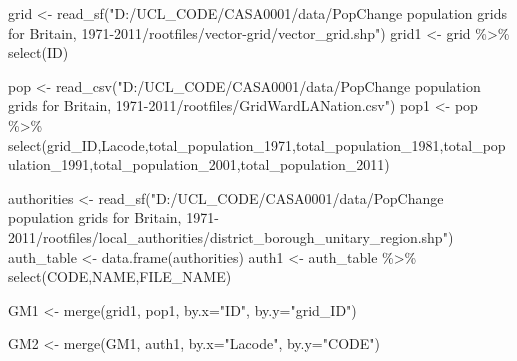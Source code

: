 \documentclass[
]{article}
\newenvironment{Shaded}{\begin{snugshade}}{\end{snugshade}}
\newcommand{\AttributeTok}[1]{\textcolor[rgb]{0.77,0.63,0.00}{#1}}
\newcommand{\FunctionTok}[1]{\textcolor[rgb]{0.00,0.00,0.00}{#1}}
\newcommand{\NormalTok}[1]{#1}
\newcommand{\OtherTok}[1]{\textcolor[rgb]{0.56,0.35,0.01}{#1}}
\newcommand{\SpecialCharTok}[1]{\textcolor[rgb]{0.00,0.00,0.00}{#1}}
\newcommand{\StringTok}[1]{\textcolor[rgb]{0.31,0.60,0.02}{#1}}
\begin{document}
\begin{Shaded}
\begin{Highlighting}[]
\NormalTok{grid }\OtherTok{\textless{}{-}} \FunctionTok{read\_sf}\NormalTok{(}\StringTok{"D:/UCL\_CODE/CASA0001/data/PopChange population grids for Britain, 1971{-}2011/rootfiles/vector{-}grid/vector\_grid.shp"}\NormalTok{)}
\NormalTok{grid1 }\OtherTok{\textless{}{-}}\NormalTok{ grid }\SpecialCharTok{\%\textgreater{}\%} \FunctionTok{select}\NormalTok{(ID)}

\NormalTok{pop }\OtherTok{\textless{}{-}} \FunctionTok{read\_csv}\NormalTok{(}\StringTok{"D:/UCL\_CODE/CASA0001/data/PopChange population grids for Britain, 1971{-}2011/rootfiles/GridWardLANation.csv"}\NormalTok{)}
\NormalTok{pop1 }\OtherTok{\textless{}{-}}\NormalTok{ pop }\SpecialCharTok{\%\textgreater{}\%} \FunctionTok{select}\NormalTok{(grid\_ID,Lacode,total\_population\_1971,total\_population\_1981,total\_population\_1991,total\_population\_2001,total\_population\_2011)}

\NormalTok{authorities }\OtherTok{\textless{}{-}} \FunctionTok{read\_sf}\NormalTok{(}\StringTok{"D:/UCL\_CODE/CASA0001/data/PopChange population grids for Britain, 1971{-}2011/rootfiles/local\_authorities/district\_borough\_unitary\_region.shp"}\NormalTok{)}
\NormalTok{auth\_table }\OtherTok{\textless{}{-}} \FunctionTok{data.frame}\NormalTok{(authorities)}
\NormalTok{auth1 }\OtherTok{\textless{}{-}}\NormalTok{ auth\_table }\SpecialCharTok{\%\textgreater{}\%} \FunctionTok{select}\NormalTok{(CODE,NAME,FILE\_NAME)}

\NormalTok{GM1 }\OtherTok{\textless{}{-}} \FunctionTok{merge}\NormalTok{(grid1,}
\NormalTok{              pop1,}
              \AttributeTok{by.x=}\StringTok{"ID"}\NormalTok{,}
              \AttributeTok{by.y=}\StringTok{"grid\_ID"}\NormalTok{)}

\NormalTok{GM2 }\OtherTok{\textless{}{-}} \FunctionTok{merge}\NormalTok{(GM1,}
\NormalTok{              auth1,}
              \AttributeTok{by.x=}\StringTok{"Lacode"}\NormalTok{,}
              \AttributeTok{by.y=}\StringTok{"CODE"}\NormalTok{)}


\end{Highlighting}
\end{Shaded}
\end{document}
